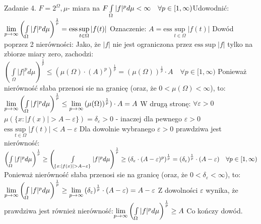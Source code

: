 \documentclass{article}
\begin{document}
Zadanie 4.
\newline
\newline
$F=2^{\Omega},\mu$- miara na $F\newline
\int\limits_{\Omega}|f|^pd\mu<\infty\quad\forall p\in[1,\infty)\newline
$Udowodnić:\newline 
$
\lim\limits_{p\rightarrow\infty}\left(\int\limits_{\Omega}|f|^pd\mu\right)^{\frac{1}{p}}=\text{ess}\sup\limits_{t\in\Omega}|f(t)|\newline
$
Oznaczenie: $A=\text{ess}\sup\limits_{t\in\Omega}|f(t)|$\newline
Dowód poprzez 2 nierówności:\newline
Jako, że $|f|$ nie jest ograniczona przez $\text{ess}\sup|f|$ tylko na zbiorze miary zero, zachodzi:\newline
$
\left(\int\limits_{\Omega}|f|^pd\mu\right)^{\frac{1}{p}}\le\left(\mu(\Omega)\cdot(A)^p\right)^{\frac{1}{p}}=
\left(\mu(\Omega)\right)^{\frac{1}{p}}\cdot A\quad\forall p\in [1,\infty)$\newline
Ponieważ nierówność słaba przenosi sie na granicę (oraz, że $0<\mu(\Omega)<\infty$), to:\newline
$
\lim\limits_{p\rightarrow\infty}\left(\int\limits_{\Omega}|f|^pd\mu\right)^{\frac{1}{p}}\le
\lim\limits_{p\rightarrow\infty}\left(\mu(\Omega)\right)^{\frac{1}{p}})\cdot A=A\newline
$
W drugą stronę: $\forall \varepsilon>0$ $\mu(\{x:|f(x)|>A-\varepsilon\})=\delta_{\varepsilon}>0$
- inaczej dla pewnego $\varepsilon>0$ $\text{ess}\sup\limits_{t\in\Omega}|f(t)|<A-\varepsilon$\newline
Dla dowolnie wybranego $\varepsilon>0$ prawdziwa jest nierówność:\newline
$
\left(\int\limits_{\Omega}|f|^pd\mu\right)^{\frac{1}{p}}\ge\left(\int\limits_{\{x:|f(x)|>A-\varepsilon\}}|f|^pd\mu\right)^{\frac{1}{p}}\ge
\left(\delta_{\varepsilon}\cdot(A-\varepsilon)^p\right)^{\frac{1}{p}}=
\left(\delta_{\varepsilon}\right)^{\frac{1}{p}}\cdot (A-\varepsilon)\quad\forall p\in [1,\infty)\newline
$
Ponieważ nierówność słaba przenosi sie na granicę (oraz, że $0<\delta_{\varepsilon}<\infty$), to:\newline
$
\lim\limits_{p\rightarrow\infty}\left(\int\limits_{\Omega}|f|^pd\mu\right)^{\frac{1}{p}}\ge
\lim\limits_{p\rightarrow\infty}\left(\delta_{\varepsilon}\right)^{\frac{1}{p}}\cdot (A-\varepsilon)=A-\varepsilon\newline
$
Z dowolności $\varepsilon$ wynika, że prawdziwa jest również nierówność:\newline$
\lim\limits_{p\rightarrow\infty}\left(\int\limits_{\Omega}|f|^pd\mu\right)^{\frac{1}{p}}\ge A\newline
$
Co kończy dowód.\newpage
\end{document}
